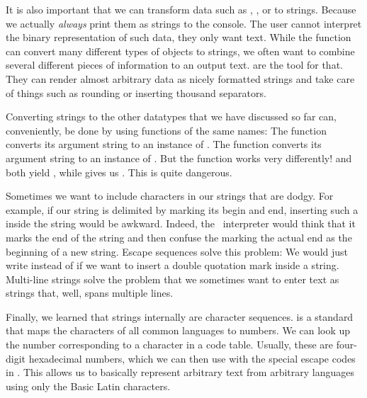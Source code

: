 It is also important that we can transform data such as , , or  to strings.
Because we actually \emph{always} print them as strings to the console.
The user cannot interpret the binary representation of such data, they only want text.
While the function  can convert many different types of objects to strings, we often want to combine several different pieces of information to an output text.
 are the tool for that.
They can render almost arbitrary data as nicely formatted strings and take care of things such as rounding or inserting thousand separators.

Converting strings to the other datatypes that we have discussed so far can, conveniently, be done by using functions of the same names:
The function  converts its argument string to an instance of .
The function  converts its argument string to an instance of .
But the function  works very differently!
 and  both yield , while  gives us .
This is quite dangerous.

Sometimes we want to include characters in our strings that are dodgy.
For example, if our string is delimited by  marking its begin and end, inserting such a  inside the string would be awkward.
Indeed, the \python\ interpreter would think that it marks the end of the string and then confuse the  marking the actual end as the beginning of a new string.
Escape sequences solve this problem:
We would just write  instead of  if we want to insert a double quotation mark inside a string.
Multi-line strings solve the problem that we sometimes want to enter text as strings that, well, spans multiple lines.

Finally, we learned that strings internally are  character sequences.
 is a standard that maps the characters of all common languages to numbers.
We can look up the number corresponding to a character in a  code table.
Usually, these are four-digit hexadecimal numbers, which we can then use with the special \pythonil{\\u} escape codes in \python.
This allows us to basically represent arbitrary text from arbitrary languages using only the Basic Latin characters.%
\endhsection%
%
\FloatBarrier%
\endhsection%
%
